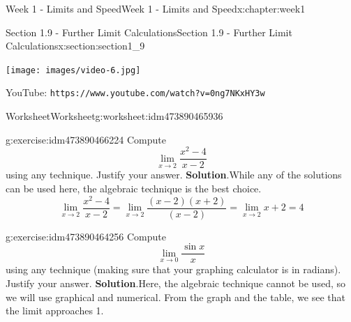 \documentclass[oneside,10pt,]{book}
\newcommand{\blocktitlefont}{\relax}
\newcommand{\mono}[1]{\texttt{#1}}
\numberwithin{equation}{section}
\newlength{\qrsize}
\newlength{\previewwidth}
\begin{document}
\begin{chapterptx}{Week 1 - Limits and Speed}{}{Week 1 - Limits and Speed}{}{}{x:chapter:week1}
\begin{sectionptx}{Section 1.9 - Further Limit Calculations}{}{Section 1.9 - Further Limit Calculations}{}{}{x:section:section1_9}
\setlength{\qrsize}{9em}
\setlength{\previewwidth}{\linewidth}
\addtolength{\previewwidth}{-\qrsize}
\begin{tcbraster}[raster columns=2, raster column skip=1pt, raster halign=center, raster force size=false, raster left skip=0pt, raster right skip=0pt]%
\begin{tcolorbox}[previewstyle, width=\previewwidth]%
\texttt{[image: images/video-6.jpg]}%
\end{tcolorbox}%
\begin{tcolorbox}[qrstyle]%
{\hypersetup{urlcolor=black}}%
\end{tcolorbox}%
\begin{tcolorbox}[captionstyle]%
\small YouTube: \mono{https://www.youtube.com/watch?v=0ng7NKxHY3w}\end{tcolorbox}%
\end{tcbraster}%
%
%
\typeout{************************************************}
\typeout{************************************************}
%
\begin{worksheet-subsection}{Worksheet}{}{Worksheet}{}{}{g:worksheet:idm473890465936}
\begin{divisionexercise}{1}{}{}{g:exercise:idm473890466224}%
Compute%
\begin{equation*}
\lim_{x\to 2} \frac{x^2-4}{x-2} 
\end{equation*}
using any technique. Justify your answer.%
\textbf{\blocktitlefont Solution}.\hypertarget{g:solution:idm473890465632}{}\quad{}While any of the solutions can be used here, the algebraic technique is the best choice.%
\begin{equation*}
\lim_{x\to 2} \frac{x^2-4}{x-2} = \lim_{x\to 2} \frac{(x-2)(x+2)}{(x-2)} = \lim_{x\to 2} x+2 = 4 
\end{equation*}
%
\end{divisionexercise}%
\begin{divisionexercise}{2}{}{}{g:exercise:idm473890464256}%
Compute%
\begin{equation*}
\lim_{x\to 0} \frac{\sin x}{x} 
\end{equation*}
using any technique (making sure that your graphing calculator is in radians). Justify your answer.%
\textbf{\blocktitlefont Solution}.\hypertarget{g:solution:idm473890464432}{}\quad{}Here, the algebraic technique cannot be used, so we will use graphical and numerical. From the graph and the table, we see that the limit approaches 1.%

\end{divisionexercise}
\end{worksheet-subsection}
\end{sectionptx}
\end{chapterptx}
\end{document}
